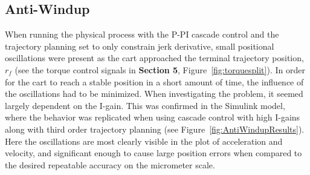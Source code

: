 \documentclass{article}
\begin{document}
\subsection{Anti-Windup}
When running the physical process with the P-PI cascade control and the trajectory planning set to only constrain jerk derivative, small positional oscillations were present as the cart approached the terminal trajectory position, $r_f$ (see the torque control signals in \textbf{Section 5}, Figure~\ref{fig:torquesplit}). In order for the cart to reach a stable position in a short amount of time, the influence of the oscillations had to be minimized. When investigating the problem, it seemed largely dependent on the I-gain. This was confirmed in the Simulink model, where the behavior was replicated when using cascade control with high I-gains along with third order trajectory planning (see Figure~\ref{fig:AntiWindupResults}). Here the oscillations are most clearly visible in the plot of acceleration and velocity, and significant enough to cause large position errors when compared to the desired repeatable accuracy on the micrometer scale.
\end{document}
